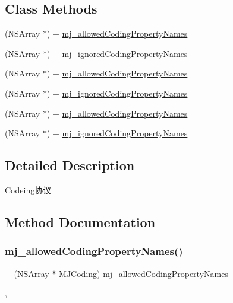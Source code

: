 \subsection*{Class Methods}
\begin{DoxyCompactItemize}
\item 
(N\+S\+Array $\ast$) + \mbox{\hyperlink{protocol_m_j_coding_01-p_ac0f7b6ca016400161977a546a348bf45}{mj\+\_\+allowed\+Coding\+Property\+Names}}
\item 
(N\+S\+Array $\ast$) + \mbox{\hyperlink{protocol_m_j_coding_01-p_add6c186ab2504983dd45153e24f50a7b}{mj\+\_\+ignored\+Coding\+Property\+Names}}
\item 
(N\+S\+Array $\ast$) + \mbox{\hyperlink{protocol_m_j_coding_01-p_ac0f7b6ca016400161977a546a348bf45}{mj\+\_\+allowed\+Coding\+Property\+Names}}
\item 
(N\+S\+Array $\ast$) + \mbox{\hyperlink{protocol_m_j_coding_01-p_add6c186ab2504983dd45153e24f50a7b}{mj\+\_\+ignored\+Coding\+Property\+Names}}
\item 
(N\+S\+Array $\ast$) + \mbox{\hyperlink{protocol_m_j_coding_01-p_ac0f7b6ca016400161977a546a348bf45}{mj\+\_\+allowed\+Coding\+Property\+Names}}
\item 
(N\+S\+Array $\ast$) + \mbox{\hyperlink{protocol_m_j_coding_01-p_add6c186ab2504983dd45153e24f50a7b}{mj\+\_\+ignored\+Coding\+Property\+Names}}
\end{DoxyCompactItemize}


\subsection{Detailed Description}
Codeing协议 

\subsection{Method Documentation}
\mbox{\label{protocol_m_j_coding_01-p_ac0f7b6ca016400161977a546a348bf45}} 
\subsubsection{\texorpdfstring{mj\+\_\+allowed\+Coding\+Property\+Names()}{mj\_allowedCodingPropertyNames()}\hspace{0.1cm}{\footnotesize\ttfamily [1/3]}}
{\footnotesize\ttfamily + (N\+S\+Array $\ast$ M\+J\+Coding) mj\+\_\+allowed\+Coding\+Property\+Names \begin{DoxyParamCaption}{ }\end{DoxyParamCaption}\hspace{0.3cm}{\ttfamily [static]}, {\ttfamily [optional]}}

